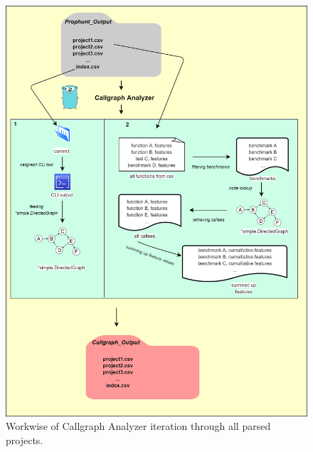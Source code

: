 \documentclass{seal_thesis}
\begin{document}
\begin{figure}[H]
	\centering
	\includegraphics[width=0.9\linewidth]{callgraph}
	\caption{Workwise of Callgraph Analyzer iteration through all parsed projects.}
	\label{fig:callgraph}
\end{figure}
 
\end{document}
